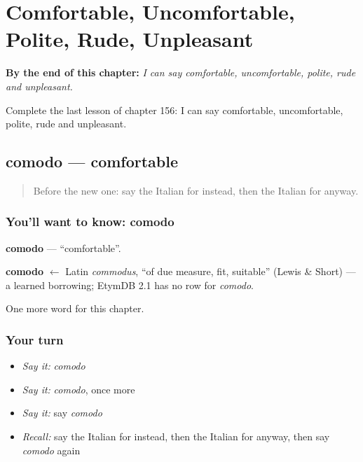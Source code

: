 
\chapter{Comfortable, Uncomfortable, Polite, Rude, Unpleasant}
\label{ch:it-comfortable-uncomfortable-polite-rude-unpleasant}

\begin{chapteropening}
\textbf{By the end of this chapter:} \emph{I can say comfortable, uncomfortable, polite, rude and unpleasant.}

Complete the last lesson of chapter 156: I can say comfortable, uncomfortable, polite, rude and unpleasant.
\end{chapteropening}

\section[comodo]{comodo — comfortable}

\label{lesson:IT-C156-comodo}



\begin{quote}
Before the new one: say the Italian for instead, then the Italian for anyway.
\end{quote}

\subsection*{You'll want to know: comodo}
\textbf{comodo} — \textquotedblleft{}comfortable\textquotedblright{}.

\begin{cousinweb}
\textbf{comodo} $\leftarrow$ Latin \emph{commodus}, \textquotedblleft{}of due measure, fit, suitable\textquotedblright{} (Lewis \& Short) — a learned borrowing; EtymDB 2.1 has no row for \emph{comodo}.
\end{cousinweb}

\begin{grammarlens}[title={What you've built}]
One more word for this chapter.
\end{grammarlens}

\subsection*{Your turn}
\begin{itemize}
\raggedright
  \item \emph{Say it:} \emph{comodo}
  \item \emph{Say it:} \emph{comodo}, once more
  \item \emph{Say it:} say \emph{comodo}
  \item \emph{Recall:} say the Italian for instead, then the Italian for anyway, then say \emph{comodo} again
\end{itemize}

